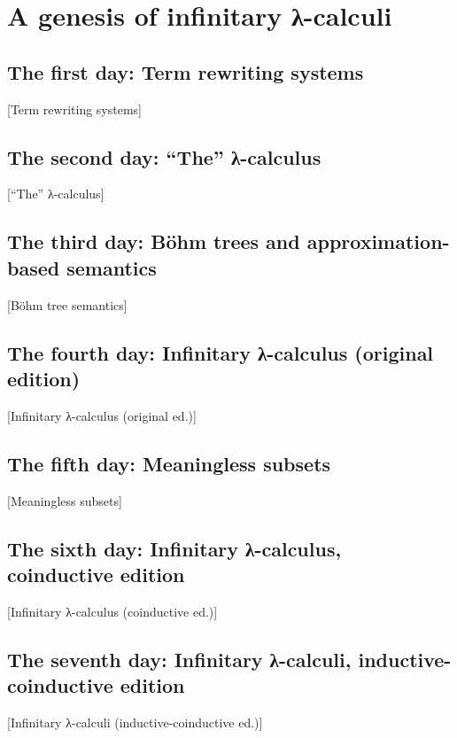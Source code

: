 \chapter{A genesis of infinitary λ-calculi}
\label{chap:lambda}
\margintoc


\section{The first day: Term rewriting systems}%
[Term rewriting systems]

\lipsum[1]


\section{The second day: \enquote{The} λ-calculus}%
[\enquote{The} λ-calculus]

\lipsum[2]


\section{The third day: Böhm trees and approximation-based semantics}%
[Böhm tree semantics]

\lipsum[3]


\section{The fourth day: Infinitary λ-calculus (original edition)}%
[Infinitary λ-calculus (original ed.)]

\lipsum[4]


\section{The fifth day: Meaningless subsets}%
[Meaningless subsets]

\lipsum[5]


\section{The sixth day: Infinitary λ-calculus, coinductive edition}%
[Infinitary λ-calculus (coinductive ed.)]

\lipsum[6]


\section{The seventh day: Infinitary λ-calculi, inductive-coinductive edition}%
[Infinitary λ-calculi (inductive-coinductive ed.)]

\lipsum[7]

